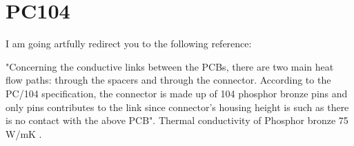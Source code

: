 \documentclass[final]{cubedoc}
\begin{document}
	
	
	
	
	\section{PC104}
	
	I am going artfully redirect you to the following reference:
	
	"Concerning the conductive links between the PCBs, there are two main heat ﬂow paths: through the spacers and through the connector. According to the PC/104 specification, the connector is made up of 104 phosphor bronze pins and only pins contributes to the link since connector’s housing height is such as there is no contact with the above PCB". Thermal conductivity of Phosphor bronze 75 W/mK \cite[p.104]{jacques2009thermal}. 
	
\end{document}
